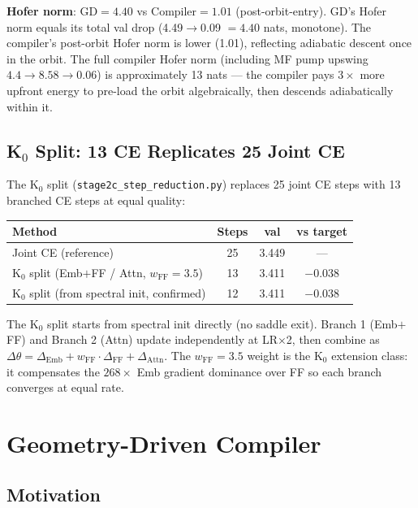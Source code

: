 \documentclass[11pt]{amsart}
\begin{document}
\textbf{Hofer norm}: GD$=4.40$ vs Compiler$=1.01$ (post-orbit-entry).
GD's Hofer norm equals its total val drop (4.49$\to$0.09 $= 4.40$ nats,
monotone).
The compiler's post-orbit Hofer norm is lower (1.01),
reflecting adiabatic descent once in the orbit.
The full compiler Hofer norm (including MF pump upswing
$4.4\to8.58\to0.06$) is approximately 13 nats ---
the compiler pays $3\times$ more upfront energy
to pre-load the orbit algebraically,
then descends adiabatically within it.

\subsection{K$_0$ Split: 13 CE Replicates 25 Joint CE}

The K$_0$ split (\texttt{stage2c\_step\_reduction.py}) replaces
25 joint CE steps with 13 branched CE steps at equal quality:

\begin{center}
\small
\begin{tabular}{lccc}
\toprule
Method & Steps & val & vs target \\
\midrule
Joint CE (reference) & 25 & 3.449 & --- \\
K$_0$ split (Emb$+$FF / Attn, $w_\mathrm{FF}=3.5$) & 13 & 3.411 & $-0.038$ \\
K$_0$ split (from spectral init, confirmed) & 12 & 3.411 & $-0.038$ \\
\bottomrule
\end{tabular}
\end{center}

The K$_0$ split starts from spectral init directly (no saddle exit).
Branch 1 (Emb$+$FF) and Branch 2 (Attn) update independently at LR$\times$2,
then combine as $\Delta\theta = \Delta_\mathrm{Emb} + w_\mathrm{FF}\cdot\Delta_\mathrm{FF} + \Delta_\mathrm{Attn}$.
The $w_\mathrm{FF}=3.5$ weight is the K$_0$ extension class:
it compensates the $268\times$ Emb gradient dominance over FF
so each branch converges at equal rate.

\section{Geometry-Driven Compiler}
\label{sec:geometric}

\subsection{Motivation}
\end{document}

